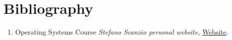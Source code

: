 \documentclass[../main.tex]{subfiles}
\begin{document}
\clearpage
\thispagestyle{empty}

\vspace*{7cm}
\section*{Bibliography}
\vspace*{1.5cm}

\begin{enumerate}




\item Operating Systems Course
\textit{Stefano Scanzio personal website,} \href{https://www.skenz.it/os}{Website}.






\end{enumerate}
\end{document}
